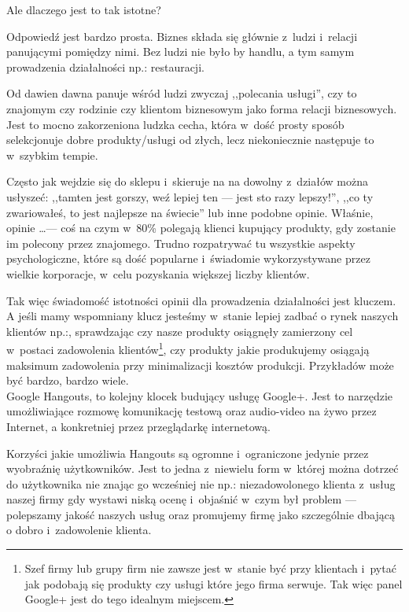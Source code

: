 Ale dlaczego jest to tak istotne?

Odpowiedź jest bardzo prosta. Biznes składa się głównie z~ludzi i~relacji panującymi pomiędzy nimi. Bez ludzi nie było by handlu, a tym samym prowadzenia działalności np.: restauracji.

Od dawien dawna panuje wśród ludzi zwyczaj ,,polecania usługi'', czy to znajomym czy rodzinie czy klientom biznesowym jako forma relacji biznesowych. Jest to mocno zakorzeniona ludzka cecha, która w~dość prosty sposób selekcjonuje dobre produkty/usługi od złych, lecz niekoniecznie następuje to w~szybkim tempie.

Często jak wejdzie się do sklepu i~skieruje na na dowolny z~działów można usłyszeć: ,,tamten jest gorszy, weź lepiej ten --- jest sto razy lepszy!'', ,,co ty zwariowałeś, to jest najlepsze na świecie'' lub inne podobne opinie. Właśnie, opinie \dots --- coś na czym w~80\% polegają klienci kupujący produkty, gdy zostanie im polecony przez znajomego. Trudno rozpatrywać tu wszystkie aspekty psychologiczne, które są dość popularne i~świadomie wykorzystywane przez wielkie korporacje, w~celu pozyskania większej liczby klientów.

Tak więc świadomość istotności opinii dla prowadzenia działalności jest kluczem. A jeśli mamy wspomniany klucz jesteśmy w~stanie lepiej zadbać o rynek naszych klientów np.:, sprawdzając czy nasze produkty osiągnęły zamierzony cel w~postaci zadowolenia klientów\footnote{Szef firmy lub grupy firm nie zawsze jest w~stanie być przy klientach i~pytać jak podobają się produkty czy usługi które jego firma serwuje. Tak więc panel Google+ jest do tego idealnym miejscem.}, czy produkty jakie produkujemy osiągają maksimum zadowolenia przy minimalizacji kosztów produkcji. Przykładów może być bardzo, bardzo wiele.\\

Google Hangouts, to kolejny klocek budujący usługę Google+. Jest to narzędzie umożliwiające rozmowę komunikację testową oraz audio-video na żywo przez Internet, a konkretniej przez przeglądarkę internetową.

Korzyści jakie umożliwia Hangouts są ogromne i~ograniczone jedynie przez wyobraźnię użytkowników. Jest to jedna z~niewielu form w~której można dotrzeć do użytkownika nie znając go wcześniej nie np.: niezadowolonego klienta z~usług naszej firmy gdy wystawi niską ocenę i~objaśnić w~czym był problem --- polepszamy jakość naszych usług oraz promujemy firmę jako szczególnie dbającą o dobro i~zadowolenie klienta.

